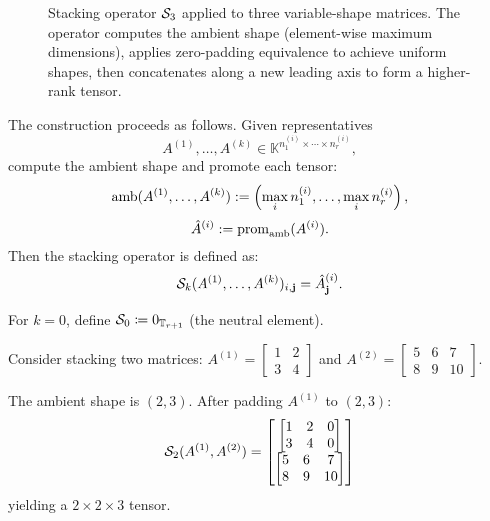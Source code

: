 \begin{figure}[h]
\caption{Stacking operator $\mathcal{S}_3$ applied to three variable-shape matrices. The operator computes the ambient shape (element-wise maximum dimensions), applies zero-padding equivalence to achieve uniform shapes, then concatenates along a new leading axis to form a higher-rank tensor.}
\label{fig:stacking}
\end{figure}

The construction proceeds as follows. Given representatives
\[
A^{(1)}, \ldots, A^{(k)} \in \mathbb{K}^{n_1^{(i)} \times \cdots \times n_r^{(i)}},
\]
compute the ambient shape and promote each tensor:
\[
\operatorname{amb}(A^{(1)}, \ldots, A^{(k)}) := \left(\max_i n_1^{(i)}, \ldots, \max_i n_r^{(i)}\right),
\]
\[
\hat{A}^{(i)} := \operatorname{prom}_{\operatorname{amb}}(A^{(i)}).
\]
Then the stacking operator is defined as:
\[
\mathcal{S}_k(A^{(1)}, \ldots, A^{(k)})_{i,\mathbf{j}} = \hat{A}^{(i)}_{\mathbf{j}}.
\]

For $k = 0$, define $\mathcal{S}_0 \coloneqq 0_{\mathbb{T}_{r+1}}$ (the neutral element).

\begin{example}
Consider stacking two matrices: $A^{(1)} = \begin{bmatrix} 1 & 2 \\ 3 & 4 \end{bmatrix}$ and $A^{(2)} = \begin{bmatrix} 5 & 6 & 7 \\ 8 & 9 & 10 \end{bmatrix}$.

The ambient shape is $(2, 3)$. After padding $A^{(1)}$ to $(2, 3)$:
\[
\mathcal{S}_2(A^{(1)}, A^{(2)}) = \begin{bmatrix}
\begin{bmatrix} 1 & 2 & 0 \\ 3 & 4 & 0 \end{bmatrix} \\[0.5em]
\begin{bmatrix} 5 & 6 & 7 \\ 8 & 9 & 10 \end{bmatrix}
\end{bmatrix}
\]
yielding a $2 \times 2 \times 3$ tensor.
\end{example}

